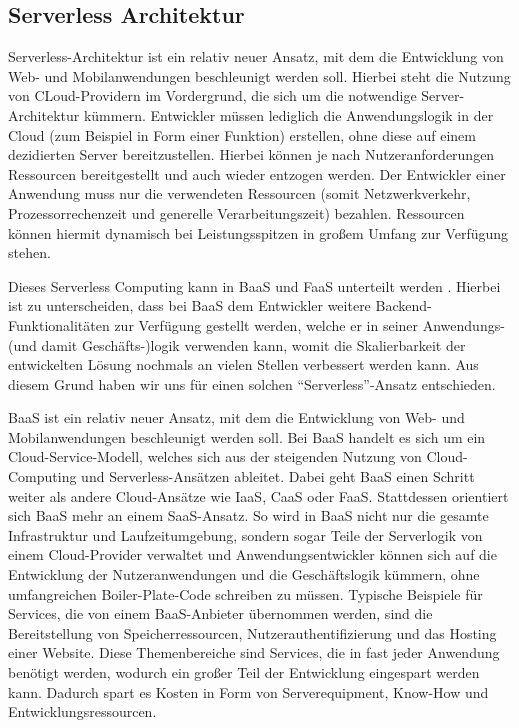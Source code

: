 \subsection{Serverless Architektur}
Serverless-Architektur ist ein relativ neuer Ansatz, mit dem die Entwicklung von Web- und Mobilanwendungen beschleunigt werden soll.
Hierbei steht die Nutzung von CLoud-Providern im Vordergrund, die sich um die notwendige Server-Architektur kümmern. Entwickler müssen lediglich die Anwendungslogik in der Cloud (zum Beispiel in Form einer Funktion) erstellen, ohne diese auf einem dezidierten Server bereitzustellen.
Hierbei können je nach Nutzeranforderungen Ressourcen bereitgestellt und auch wieder entzogen werden. Der Entwickler einer Anwendung muss nur die verwendeten Ressourcen (somit Netzwerkverkehr, Prozessorrechenzeit und generelle Verarbeitungszeit) bezahlen. Ressourcen können hiermit dynamisch bei Leistungsspitzen in großem Umfang zur Verfügung stehen.

Dieses Serverless Computing kann in \ac{BaaS} und \ac{FaaS} unterteilt werden \autocite{whatIsServerless}. Hierbei ist zu unterscheiden, dass bei \ac{BaaS} dem Entwickler weitere Backend-Funktionalitäten zur Verfügung gestellt werden, welche er in seiner Anwendungs- (und damit Geschäfts-)logik verwenden kann, womit die Skalierbarkeit der entwickelten Lösung nochmals an vielen Stellen verbessert werden kann. Aus diesem Grund haben wir uns für einen solchen \enquote{Serverless}-Ansatz entschieden.

\ac{BaaS} ist ein relativ neuer Ansatz, mit dem die Entwicklung von Web- und Mobilanwendungen beschleunigt werden soll.
Bei \ac{BaaS} handelt es sich um ein Cloud-Service-Modell, welches sich aus der steigenden Nutzung von Cloud-Computing und Serverless-Ansätzen ableitet.
Dabei geht \ac{BaaS} einen Schritt weiter als andere Cloud-Ansätze wie \ac{IaaS}, \ac{CaaS} oder \ac{FaaS}.
Stattdessen orientiert sich \ac{BaaS} mehr an einem \ac{SaaS}-Ansatz. %
So wird in \ac{BaaS} nicht nur die gesamte Infrastruktur und Laufzeitumgebung, sondern sogar Teile der Serverlogik von einem Cloud-Provider verwaltet\autocite[Vgl.][]{cloudflareBaaS} und Anwendungsentwickler können sich auf die Entwicklung der Nutzeranwendungen und die Geschäftslogik kümmern, ohne umfangreichen Boiler-Plate-Code schreiben zu müssen.
Typische Beispiele für Services, die von einem \ac{BaaS}-Anbieter übernommen werden, sind die Bereitstellung von Speicherressourcen, Nutzerauthentifizierung und das Hosting einer Website.
Diese Themenbereiche sind Services, die in fast jeder Anwendung benötigt werden, wodurch ein großer Teil der Entwicklung eingespart werden kann.
Dadurch spart es Kosten in Form von Serverequipment, Know-How und Entwicklungsressourcen.

